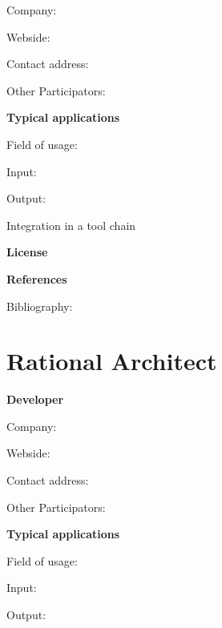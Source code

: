 \documentclass{./template/openetcs2}
\begin{document}
	Company: 

	Webside:

	Contact address:

	Other  Participators:



	\textbf{Typical applications}

	Field of usage:


	Input:

	Output:





	Integration in a tool chain



	\textbf{License}


	\textbf{References}

	Bibliography:


\section{Rational Architect}

	\textbf{Developer}

	Company: 

	Webside:

	Contact address:

	Other  Participators:



	\textbf{Typical applications}

	Field of usage:


	Input:

	Output:


\end{document}
